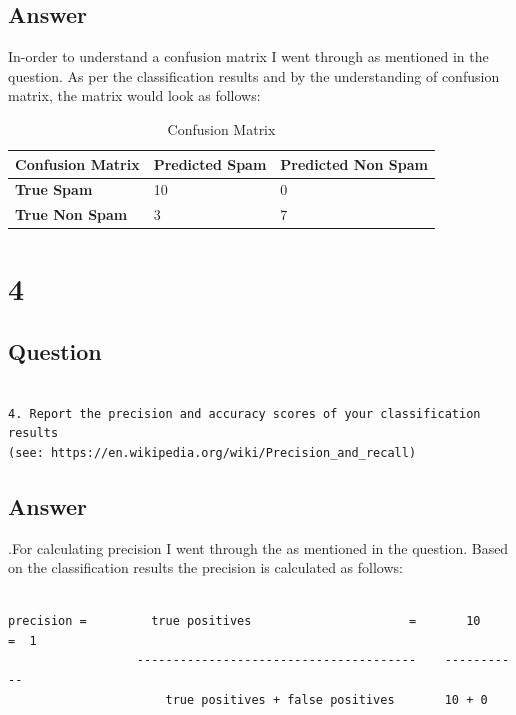 \documentclass[letterpaper,11pt]{article}
\begin{document}
\clearpage
\subsection*{Answer}

In-order to understand a confusion matrix I went through \cite{conref} as mentioned in the question. As per the classification results and by the understanding of confusion matrix, the matrix would look as follows:


\begin{table}
\begin{tabular}{ | l | l | p{8.2cm} | }
\hline
\textbf{Confusion Matrix} & \textbf{Predicted Spam} & \textbf{Predicted Non Spam} \\
\hline
\textbf{True Spam} & 10  & 0 \\
\hline
\textbf{True Non Spam} & 3 & 7 \\
\hline
\end{tabular}
\caption{Confusion Matrix}
\label{table:conf}
\end{table}

\clearpage


\section*{4}

\subsection*{Question}

\begin{verbatim}

4. Report the precision and accuracy scores of your classification results
(see: https://en.wikipedia.org/wiki/Precision_and_recall)

\end{verbatim}

\clearpage
\subsection*{Answer}

.For calculating precision I went through the \cite{precref} as mentioned in the question. Based on the classification results the precision is calculated as follows:

\begin{verbatim}

precision =         true positives                      =       10        =  1
                  ---------------------------------------    -----------
                      true positives + false positives       10 + 0

\end{verbatim}
\end{document}
